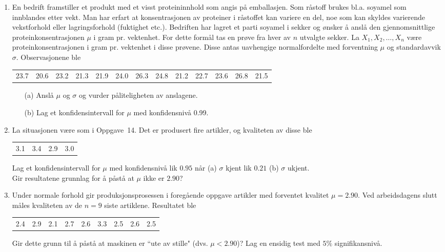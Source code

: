 \begin{enumerate}
               
\item     En bedrift framstiller et produkt med et visst
          proteininnhold som angis på emballasjen. Som
          råstoff brukes bl.a. soyamel som innblandes etter
          vekt. Man har erfart at konsentrasjonen av proteiner i
          råstoffet kan variere en del, noe som kan skyldes
          varierende vekstforhold eller lagringsforhold
          (fuktighet etc.). Bedriften har lagret et parti soyamel
          i sekker og ønsker å anslå den
          gjennomsnittlige proteinkonsentrasjonen $\mu$ i gram
          pr. vektenhet. For dette formål tas en prøve fra
          hver av $n$ utvalgte sekker. La $X_1,X_2,\ldots ,X_n$
          være proteinkonsentrasjonen i gram pr. vektenhet i
          disse prøvene. Disse antas uavhengige normalfordelte
          med forventning $\mu$ og standardavvik $\sigma$.
          Observasjonene ble
   \begin{center} \scriptsize \addtolength{\tabcolsep}{-0.3\tabcolsep}
    \begin{tabular}{ccccccccccccc}
          23.7&20.6&23.2&21.3&21.9&24.0&26.3&24.8&21.2&22.7&23.6&26.8&21.5
    \end{tabular}
   \end{center}
 \begin{itemize}
  \item[(a)]  Anslå $\mu$ og $\sigma$ og vurder påliteligheten 
            av anslagene.
  \item[(b)]  Lag et konfidensintervall for $\mu$ med konfidensnivå 0.99.
 \end{itemize}
\item     La situasjonen være som i Oppgave~14. Det er
          produsert fire artikler, og kvaliteten av disse ble
   \begin{center}
    \begin{tabular}{cccc}
                 3.1 & 3.4 & 2.9 & 3.0
    \end{tabular}
   \end{center}
          Lag et konfidensintervall for $\mu$ med
          konfidensnivå lik $0.95$ når (a) $\sigma$ kjent
          lik $0.21$ (b) $\sigma$ ukjent.\\
          Gir resultatene grunnlag for å påstå at
          $\mu$ ikke er $2.90$?

\item     Under normale forhold gir produksjonsprosessen i
          foregående oppgave artikler med forventet kvalitet
          $\mu=2.90$. Ved arbeidsdagens slutt måles
          kvaliteten av de $n=9$ siste artiklene. Resultatet ble
   \begin{center}
    \begin{tabular}{ccccccccc}
          2.4&2.9&2.1&2.7&2.6&3.3&2.5&2.6&2.5
    \end{tabular}
   \end{center}
          Gir dette grunn til å påstå at maskinen er
          ``ute av stille" (dvs. $\mu < 2.90$)? Lag en ensidig
          test med $5\%$ signifikansnivå.


\end{enumerate}
